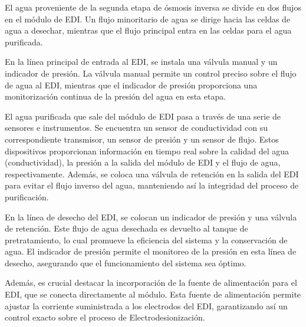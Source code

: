 El agua proveniente de la segunda etapa de ósmosis inversa se divide en dos flujos en el módulo de
EDI. Un flujo minoritario de agua se dirige hacia las celdas de agua a desechar, mientras que el flujo principal entra en las celdas para el agua purificada.


En la línea principal de entrada al EDI, se instala una válvula manual y un indicador de presión. La válvula manual permite un control preciso sobre el flujo de agua al EDI, mientras que el indicador de presión proporciona una monitorización continua de la presión del agua en esta etapa.

El agua purificada que sale del módulo de EDI pasa a través de una serie de sensores e instrumentos. Se encuentra un sensor de conductividad con su correspondiente transmisor, un sensor de presión y un sensor de flujo. Estos dispositivos proporcionan información en tiempo real sobre la calidad del agua (conductividad), la presión a la salida del módulo de EDI y el flujo de agua, respectivamente. Además, se coloca una válvula de retención en la salida del EDI para evitar el flujo inverso del agua, manteniendo así la integridad del proceso de purificación.

En la línea de desecho del EDI, se colocan un indicador de presión y una válvula de retención. Este flujo de agua desechada es devuelto al tanque de pretratamiento, lo cual promueve la eficiencia del sistema y la conservación de agua. El indicador de presión permite el monitoreo de la presión en esta línea de desecho, asegurando que el funcionamiento del sistema sea óptimo.

Además, es crucial destacar la incorporación de la fuente de alimentación para el EDI, que se conecta directamente al módulo. Esta fuente de alimentación permite ajustar la corriente suministrada a los electrodos del EDI, garantizando así un control exacto sobre el proceso de Electrodesionización.
